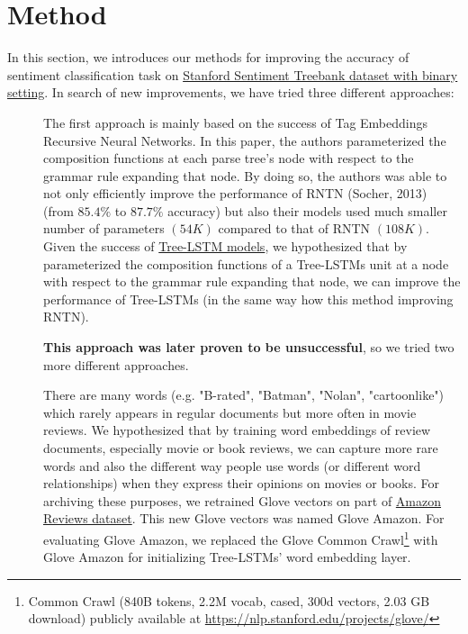 \hypertarget{chap:method}{\chapter{Method}}\label{method}
In this section, we introduces our methods for improving the accuracy of sentiment classification task on \hyperref[sec:sst]{Stanford Sentiment Treebank dataset with binary setting}.
In search of new improvements, we have tried three different approaches:
\begin{description}
\item[] The first approach is mainly based on the success of Tag Embeddings Recursive Neural Networks\cite{tag-embedding-rnn}.
In this paper, the authors parameterized the composition functions at each parse tree's node with respect to the grammar rule expanding that node. 
By doing so, the authors was able to not only efficiently improve the performance of RNTN (Socher, 2013)\cite{socher2013recursive} (from \(85.4\%\) to \(87.7\%\) accuracy) but also their models used much smaller number of parameters \((54K)\) compared to that of RNTN \((108K)\)\cite{tag-embedding-rnn}.
Given the success of \hyperref[sec:treelstm]{Tree-LSTM models}, we hypothesized that by parameterized the composition functions of a Tree-LSTMs unit at a node with respect to the grammar rule expanding that node, we can improve the performance of Tree-LSTMs (in the same way how this method improving RNTN).

\textbf{This approach was later proven to be unsuccessful}, so we tried two more different approaches.

\item[] \label{movie-hypothesis} There are many words (e.g. "B-rated", "Batman", "Nolan", "cartoonlike") which rarely appears in regular documents but more often in movie reviews.
We hypothesized that by training word embeddings of review documents, especially movie or book reviews, we can capture more rare words and also the different way people use words (or different word relationships) when they express their opinions on movies or books.
For archiving these purposes, we retrained Glove vectors\cite{glove} on part of  \hyperref[sec:amazon]{Amazon Reviews dataset}.
This new Glove vectors was named Glove Amazon.
For evaluating Glove Amazon, we replaced the Glove Common Crawl\footnote{Common Crawl (840B tokens, 2.2M vocab, cased, 300d vectors, 2.03 GB download) publicly available at \url{https://nlp.stanford.edu/projects/glove/}} with Glove Amazon for initializing Tree-LSTMs' word embedding layer.


\end{description}
